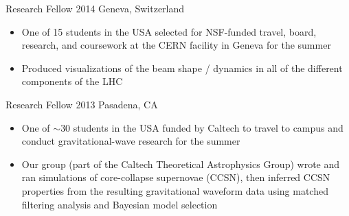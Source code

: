 \documentclass[8pt,a4paper]{altacv}
\begin{document}
            {Research Fellow}
            {2014}
            {Geneva, Switzerland}
            {\begin{itemize}[leftmargin=0pt]
            \renewcommand\labelitemi{}
                \item {\color{emphasis}One of 15 students in the USA selected for NSF-funded travel, board, research, and coursework at the CERN facility in Geneva for the summer}
                \item Produced visualizations of the beam shape / dynamics in all of the different components of the LHC
            \end{itemize}}
    
            {Research Fellow}
            {2013}
            {Pasadena, CA}
            {\begin{itemize}[leftmargin=0pt]
            \renewcommand\labelitemi{}
                \item {\color{emphasis}One of $\sim$30 students in the USA funded by Caltech to travel to campus and conduct gravitational-wave research for the summer}
                \item Our group (part of the Caltech Theoretical Astrophysics Group) wrote and ran simulations of core-collapse supernovae (CCSN), then inferred CCSN properties from the resulting gravitational waveform data using matched filtering analysis and Bayesian model selection
                \end{itemize}}
\end{document}
